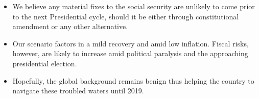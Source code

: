 \begin{itemize}
\tightlist
\item
  We believe any material fixes to the social security are unlikely to
  come prior to the next Presidential cycle, should it be either through
  constitutional amendment or any other alternative.
\item
  Our scenario factors in a mild recovery and amid low inflation. Fiscal
  risks, however, are likely to increase amid political paralysis and
  the approaching presidential election.
\item
  Hopefully, the global background remains benign thus helping the
  country to navigate these troubled waters until 2019.
\end{itemize}
